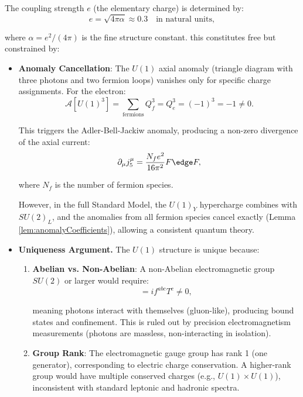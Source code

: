 \begin{enumerate}
The coupling strength $e$ (the elementary charge) is determined by:
\begin{equation}
\label{eq:electronCharge}
e = \sqrt{4\pi\alpha} \approx 0.3 \quad \text{in natural units},
\end{equation}

where $\alpha = e^2/(4\pi)$ is the fine structure constant. this constitutes free but constrained by:
\begin{itemize}
\item \textbf{Anomaly Cancellation}: The $U(1)$ axial anomaly (triangle diagram with three photons and two fermion loops) vanishes only for specific charge assignments. For the electron:
\begin{equation}
\mathcal{A}[U(1)^3] = \sum_{\text{fermions}} Q_f^3 = Q_e^3 = (-1)^3 = -1 \neq 0.
\end{equation}

This triggers the Adler-Bell-Jackiw anomaly, producing a non-zero divergence of the axial current:
\begin{equation}
\partial_\mu j^\mu_5 = \frac{N_f e^2}{16\pi^2} F \edge F,
\end{equation}

where $N_f$ is the number of fermion species.

However, in the full Standard Model, the $U(1)_Y$ hypercharge combines with $SU(2)_L$, and the anomalies from all fermion species cancel exactly (Lemma \ref{lem:anomalyCoefficients}), allowing a consistent quantum theory.

\item \textbf{Uniqueness Argument.} The $U(1)$ structure is unique because:

\begin{enumerate}[label=(\roman*)]
\item \textbf{Abelian vs. Non-Abelian}: A non-Abelian electromagnetic group $SU(2)$ or larger would require:
\begin{equation}
[T^a, T^b] = if^{abc}T^c \neq 0,
\end{equation}

meaning photons interact with themselves (gluon-like), producing bound states and confinement. This is ruled out by precision electromagnetism measurements (photons are massless, non-interacting in isolation).

\item \textbf{Group Rank}: The electromagnetic gauge group has rank 1 (one generator), corresponding to electric charge conservation. A higher-rank group would have multiple conserved charges (e.g., $U(1) \times U(1)$), inconsistent with standard leptonic and hadronic spectra.


\end{enumerate}
\end{itemize}
\end{enumerate}
